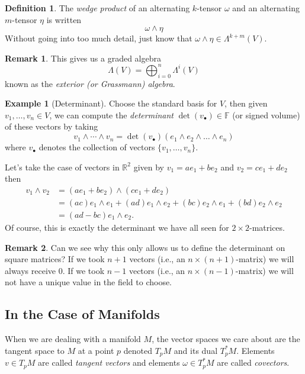 \documentclass[12pt]{article}
\newcommand{\R}{\mathbb{R}}
\newcommand{\field}{\mathbb{F}}
\theoremstyle{definition}
\newtheorem{definition}{Definition}[section]
\newtheorem{example}{Example}[section]
\newtheorem{remark}{Remark}[section]
\begin{document}
\begin{definition}
The \emph{wedge product} of an alternating $k$-tensor $\omega$ and an alternating $m$-tensor $\eta$ is written
\[
\omega \wedge \eta
\]
Without going into too much detail, just know that $\omega\wedge \eta \in \Lambda^{k+m}(V)$.
\end{definition}

\begin{remark}
This gives us a graded algebra 
\[
\Lambda(V)=\bigoplus_{i=0}^n \Lambda^i(V)
\]
known as the \emph{exterior (or Grassmann) algebra}.
\end{remark}

\begin{example}[Determinant]
Choose the standard basis for $V$, then given $v_1,\dots,v_n\in V$, we can compute the \emph{determinant} $\det(v_\bullet)\in \field$ (or signed volume) of these vectors by taking
\[
v_1\wedge \cdots \wedge v_n = \det(v_\bullet) (e_1\wedge e_2 \wedge \dots \wedge e_n)
\]
where $v_\bullet$ denotes the collection of vectors $\{v_1,\dots,v_n\}$.

Let's take the case of vectors in $\R^2$ given by $v_1=ae_1+be_2$ and $v_2=ce_1+de_2$ then
\begin{align*}
v_1\wedge v_2 &= (ae_1+be_2)\wedge (ce_1+de_2)\\
&= (ac)e_1\wedge e_1 + (ad)e_1\wedge e_2 + (bc)e_2\wedge e_1 + (bd)e_2\wedge e_2\\
&= (ad-bc)e_1\wedge e_2.
\end{align*}
Of course, this is exactly the determinant we have all seen for $2\times 2$-matrices. 
\end{example}

\begin{remark}
Can we see why this only allows us to define the determinant on square matrices?  If we took $n+1$ vectors (i.e., an $n\times (n+1)$-matrix) we will always receive 0.  If we took $n-1$ vectors (i.e., an $n\times (n-1)$-matrix) we will not have a unique value in the field to choose.
\end{remark}



\subsection{In the Case of Manifolds}
When we are dealing with a manifold $M$, the vector spaces we care about are the tangent space to $M$ at a point $p$ denoted $T_pM$ and its dual $T_p^*M$.  Elements $v\in T_pM$ are called \emph{tangent vectors} and elements $\omega \in T_p^*M$ are called \emph{covectors}.
\end{document}

